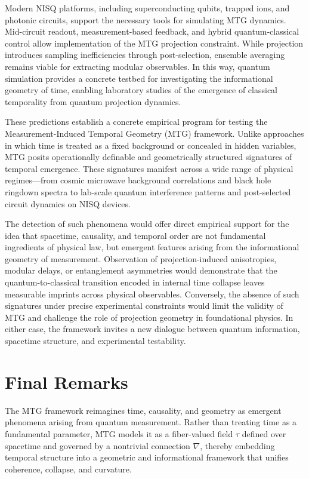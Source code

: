 \documentclass[11pt]{article}
\begin{document}
Modern NISQ platforms, including superconducting qubits, trapped ions, and photonic circuits, support the necessary tools for simulating MTG dynamics. Mid-circuit readout, measurement-based feedback, and hybrid quantum-classical control allow implementation of the MTG projection constraint. While projection introduces sampling inefficiencies through post-selection, ensemble averaging remains viable for extracting modular observables. In this way, quantum simulation provides a concrete testbed for investigating the informational geometry of time, enabling laboratory studies of the emergence of classical temporality from quantum projection dynamics.

These predictions establish a concrete empirical program for testing the Measurement-Induced Temporal Geometry (MTG) framework. Unlike approaches in which time is treated as a fixed background or concealed in hidden variables, MTG posits operationally definable and geometrically structured signatures of temporal emergence. These signatures manifest across a wide range of physical regimes—from cosmic microwave background correlations and black hole ringdown spectra to lab-scale quantum interference patterns and post-selected circuit dynamics on NISQ devices.

The detection of such phenomena would offer direct empirical support for the idea that spacetime, causality, and temporal order are not fundamental ingredients of physical law, but emergent features arising from the informational geometry of measurement. Observation of projection-induced anisotropies, modular delays, or entanglement asymmetries would demonstrate that the quantum-to-classical transition encoded in internal time collapse leaves measurable imprints across physical observables. Conversely, the absence of such signatures under precise experimental constraints would limit the validity of MTG and challenge the role of projection geometry in foundational physics. In either case, the framework invites a new dialogue between quantum information, spacetime structure, and experimental testability.

\section*{Final Remarks}
The MTG framework reimagines time, causality, and geometry as emergent phenomena arising from quantum measurement. Rather than treating time as a fundamental parameter, MTG models it as a fiber-valued field $\tau$ defined over spacetime and governed by a nontrivial connection $\nabla$, thereby embedding temporal structure into a geometric and informational framework that unifies coherence, collapse, and curvature.
\end{document}
